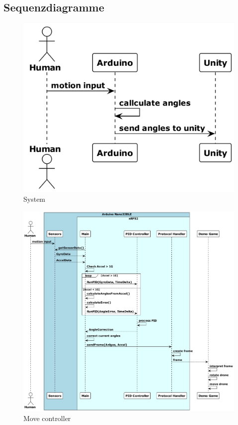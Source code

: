 \subsection{Sequenzdiagramme}
\begin{figure}[H]
  \begin{center}
    \includegraphics[width=0.7\linewidth]{content/diagrams/out/sequence/system.png}
    \caption{System}
  \end{center}
\end{figure}

\begin{figure}[H]
  \begin{center}
    \includegraphics[width=1\linewidth]{content/diagrams/out/sequence/moveController.png}
    \caption{Move controller}
  \end{center}
\end{figure}

